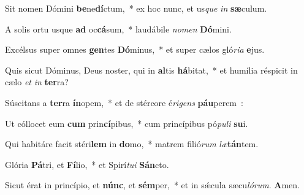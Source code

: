 ﻿\item Sit nomen Dómini \textbf{be}\-ne\textbf{dí}\-ctum,~* ex hoc nunc, et us\-\emph{que} \emph{in} \textbf{sæ}culum.
\item A solis ortu usque \textbf{ad} oc\textbf{cá}\-sum,~* laudábile \emph{no}\-\emph{men} \textbf{Dó}mini.
\item Excélsus super omnes \textbf{gen}\-tes \textbf{Dó}\-minus,~* et super cælos gló\-\emph{ri}\-\emph{a} \textbf{e}jus.
\item Quis sicut Dóminus, Deus noster, qui in \textbf{al}\-tis \textbf{há}\-bitat,~* et humília réspicit in cælo \emph{et} \emph{in} \textbf{ter}ra?
\item Súscitans a \textbf{ter}\-ra \textbf{ín}\-opem,~* et de stércore é\emph{ri}\-\emph{gens} \textbf{páu}perem~:
\item Ut cóllocet eum \textbf{cum} prin\textbf{cí}\-pibus,~* cum princípibus pó\-\emph{pu}\-\emph{li} \textbf{su}i.
\item Qui habitáre facit stéri\textbf{lem} in \textbf{do}\-mo,~* matrem fi\-li\-ó\-\emph{rum} \emph{læ}\textbf{tán}tem.
\item Glória \textbf{Pá}\-tri, et \textbf{Fí}\-lio,~* et Spirí\emph{tu}\-\emph{i} \textbf{Sán}cto.
\item Sicut érat in princípio, et \textbf{núnc}, et \textbf{sém}\-per,~* et in sǽcula sæcu\emph{ló}\-\emph{rum}. \textbf{A}men.